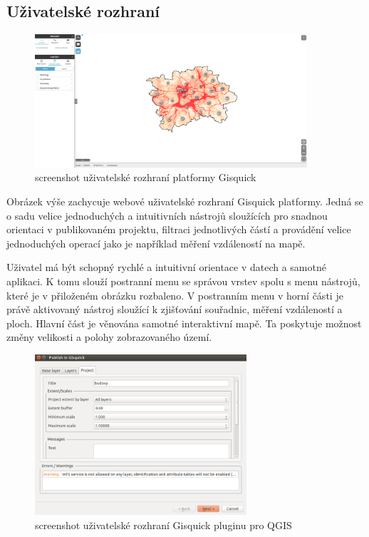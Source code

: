 \subsection{Uživatelské rozhraní}

\begin{figure}[h!]
	\centering \includegraphics[width=0.9\textwidth]{../img/gisquick_ui.png} \caption{screenshot
	uživatelské rozhraní platformy
	Gisquick\cite{gisquick-prague}} \label{fig:gisquick-prague}
\end{figure}

Obrázek výše zachycuje webové uživatelské rozhraní Gisquick
platformy. Jedná se o sadu velice jednoduchých a intuitivních nástrojů
sloužících pro snadnou orientaci v publikovaném projektu, filtraci
jednotlivých částí a provádění velice jednoduchých operací jako je
například měření vzdáleností na mapě.

Uživatel má být schopný rychlé a intuitivní orientace v datech a
samotné aplikaci. K tomu slouží postranní menu se správou vrstev spolu
s menu nástrojů, které je v přiloženém obrázku rozbaleno. V postranním
menu v horní části je právě aktivovaný nástroj sloužící k zjišťování
souřadnic, měření vzdáleností a ploch. Hlavní část je věnována samotné
interaktivní mapě. Ta poskytuje možnost změny velikosti a polohy
zobrazovaného území.

\begin{figure}[h!]
	\centering \includegraphics[width=0.7\textwidth]{../img/gisquick_plugin.png} \caption{screenshot
	uživatelské rozhraní Gisquick pluginu pro
	QGIS} \label{fig:gisquick-plugin}
\end{figure}

